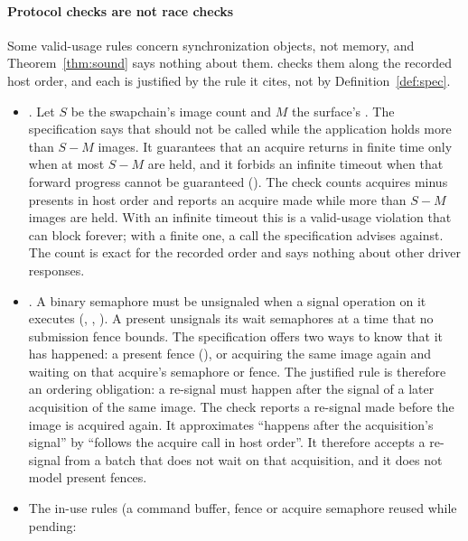 \paragraph{Protocol checks are not race checks}
\label{sec:protocol}
Some valid-usage rules concern synchronization objects, not memory, and Theorem~\ref{thm:sound} says nothing about
them. \sys checks them along the recorded host order, and each is justified by the rule it cites, not by
Definition~\ref{def:spec}.
\begin{sloppypar}
\begin{itemize}
\item {}. Let $S$ be the swapchain's image count and $M$ the surface's
  . The specification says that  should not be called while the
  application holds more than $S-M$ images. It guarantees that an acquire returns in finite time only when at most
  $S-M$ are held, and it forbids an infinite timeout when that forward progress cannot be guaranteed
  (\allowbreak{}). The check counts acquires minus presents in host order and
  reports an acquire made while more than $S-M$ images are held. With an infinite timeout this is a
  valid-usage violation that can block forever; with a finite one, a call the specification advises against. The
  count is exact for the recorded order and says nothing about other driver responses.
\item {}. A binary semaphore must be unsignaled when a signal operation on it executes
  (\allowbreak{}, \allowbreak{},
  \allowbreak{}). A present unsignals its wait semaphores at a time that no
  submission fence bounds. The specification offers two ways to know that it has happened: a present fence
  (), or acquiring the same image again and waiting on that acquire's semaphore
  or fence. The justified rule is therefore an ordering obligation: a re-signal must happen after the signal of a
  later acquisition of the same image. The check reports a re-signal made before the image is acquired again. It
  approximates ``happens after the acquisition's signal'' by ``follows the acquire call in host order''. It therefore
  accepts a re-signal from a batch that does not wait on that acquisition, and it does not model present fences.
\item The in-use rules (a command buffer, fence or acquire semaphore reused while pending:

\end{itemize}
\end{sloppypar}
